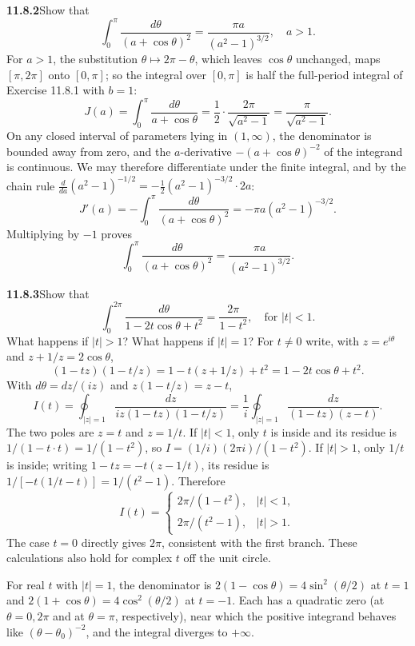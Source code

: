 \par\bigskip
\noindent\textbf{11.8.2}\quad Show that
\[
\int_{0}^{\pi}\frac{d\theta}{(a+\cos\theta)^{2}}
=\frac{\pi a}{(a^{2}-1)^{3/2}},\quad a>1.
\]
\solution
For $a>1$, the substitution $\theta\mapsto2\pi-\theta$, which leaves
$\cos\theta$ unchanged, maps $[\pi,2\pi]$ onto $[0,\pi]$; so the
integral over $[0,\pi]$ is half the full-period integral of
Exercise 11.8.1 with $b=1$:
\[
J(a)=\int_0^\pi\frac{d\theta}{a+\cos\theta}
=\frac12\cdot\frac{2\pi}{\sqrt{a^2-1}}=\frac{\pi}{\sqrt{a^2-1}}.
\]
On any closed interval of parameters lying in $(1,\infty)$, the
denominator is bounded away from zero, and the $a$-derivative
$-(a+\cos\theta)^{-2}$ of the integrand is continuous. We may therefore
differentiate under the finite integral, and by the chain rule
$\frac{d}{da}(a^2-1)^{-1/2}=-\frac12(a^2-1)^{-3/2}\cdot2a$:
\[
J'(a)=-\int_0^\pi\frac{d\theta}{(a+\cos\theta)^2}
=-\pi a(a^2-1)^{-3/2}.
\]
Multiplying by $-1$ proves
\[
\boxed{\int_0^\pi\frac{d\theta}{(a+\cos\theta)^2}
=\frac{\pi a}{(a^2-1)^{3/2}}}.
\]

\par\bigskip
\noindent\textbf{11.8.3}\quad Show that
\[
\int_{0}^{2\pi}\frac{d\theta}{1-2t\cos\theta+t^{2}}
=\frac{2\pi}{1-t^{2}},\quad\text{for }|t| < 1.
\]
What happens if $|t|>1$? What happens if $|t|=1$?
\solution
For $t\ne0$ write, with $z=e^{i\theta}$ and $z+1/z=2\cos\theta$,
\[
(1-tz)(1-t/z)=1-t(z+1/z)+t^2=1-2t\cos\theta+t^2.
\]
With $d\theta=dz/(iz)$ and $z(1-t/z)=z-t$,
\[
I(t)=\oint_{|z|=1}\frac{dz}{iz(1-tz)(1-t/z)}
=\frac1i\oint_{|z|=1}
\frac{dz}{(1-tz)(z-t)}.
\]
The two poles are $z=t$ and $z=1/t$. If $|t|<1$, only $t$ is inside
and its residue is $1/(1-t\cdot t)=1/(1-t^2)$, so
$I=(1/i)(2\pi i)/(1-t^2)$. If $|t|>1$, only $1/t$ is inside; writing
$1-tz=-t(z-1/t)$, its residue is
$1/[-t(1/t-t)]=1/(t^2-1)$. Therefore
\[
\boxed{I(t)=
\begin{cases}2\pi/(1-t^2),&|t|<1,\\
2\pi/(t^2-1),&|t|>1.
\end{cases}}
\]
The case $t=0$ directly gives $2\pi$, consistent with the first branch.
These calculations also hold for complex $t$ off the unit circle.

For real $t$ with $|t|=1$, the denominator is
$2(1-\cos\theta)=4\sin^2(\theta/2)$ at $t=1$ and
$2(1+\cos\theta)=4\cos^2(\theta/2)$ at $t=-1$. Each has a quadratic
zero (at $\theta=0,2\pi$ and at $\theta=\pi$, respectively), near which
the positive integrand behaves like $(\theta-\theta_0)^{-2}$, and
the integral diverges to $+\infty$.

